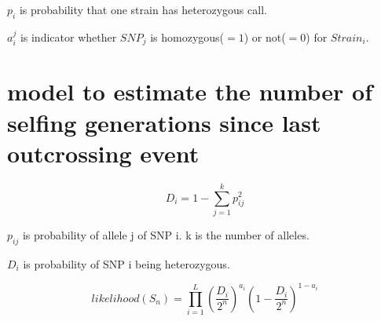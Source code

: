 \documentclass[a4paper,10pt]{article}
\begin{document}
$p_i$ is probability that one strain has heterozygous call.


$a_i^j$ is indicator whether ${SNP}_j$ is homozygous($=1$) or not($=0$) for ${Strain}_i$.


\section{model to estimate the number of selfing generations since last outcrossing event}
\begin{equation}
D_i = 1 - \sum_{j=1}^k p_{ij}^2
\end{equation}


$p_{ij}$ is probability of allele j of SNP i. k is the number of alleles.

$D_i$ is probability of SNP i being heterozygous.


\begin{equation}
likelihood(S_n) = \prod_{i=1}^L {(\frac{D_i}{2^n})}^{a_i} {(1-\frac{D_i}{2^n})}^{1-a_i}
\end{equation}



\end{document}
